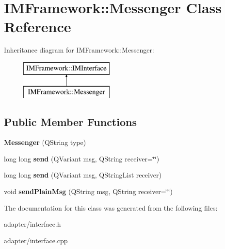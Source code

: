 \hypertarget{classIMFramework_1_1Messenger}{
\section{IMFramework::Messenger Class Reference}
\label{classIMFramework_1_1Messenger}
}
Inheritance diagram for IMFramework::Messenger:\begin{figure}[H]
\begin{center}
\leavevmode
\includegraphics[height=2cm]{classIMFramework_1_1Messenger}
\end{center}
\end{figure}
\subsection*{Public Member Functions}
\begin{DoxyCompactItemize}
\item 
\hypertarget{classIMFramework_1_1Messenger_a60f5e34abab1e90f6a8c60942168db2d}{
{\bfseries Messenger} (QString type)}
\label{classIMFramework_1_1Messenger_a60f5e34abab1e90f6a8c60942168db2d}

\item 
\hypertarget{classIMFramework_1_1Messenger_a0621b125cd33b2e6073a5c48e6a75509}{
long long {\bfseries send} (QVariant msg, QString receiver=\char`\"{}\char`\"{})}
\label{classIMFramework_1_1Messenger_a0621b125cd33b2e6073a5c48e6a75509}

\item 
\hypertarget{classIMFramework_1_1Messenger_a937bfc392b78a9e6524328adaf46a9bb}{
long long {\bfseries send} (QVariant msg, QStringList receiver)}
\label{classIMFramework_1_1Messenger_a937bfc392b78a9e6524328adaf46a9bb}

\item 
\hypertarget{classIMFramework_1_1Messenger_a65dc3f2fa38d187aa5f411e0e27483d9}{
void {\bfseries sendPlainMsg} (QString msg, QString receiver=\char`\"{}\char`\"{})}
\label{classIMFramework_1_1Messenger_a65dc3f2fa38d187aa5f411e0e27483d9}

\end{DoxyCompactItemize}


The documentation for this class was generated from the following files:\begin{DoxyCompactItemize}
\item 
adapter/interface.h\item 
adapter/interface.cpp\end{DoxyCompactItemize}

